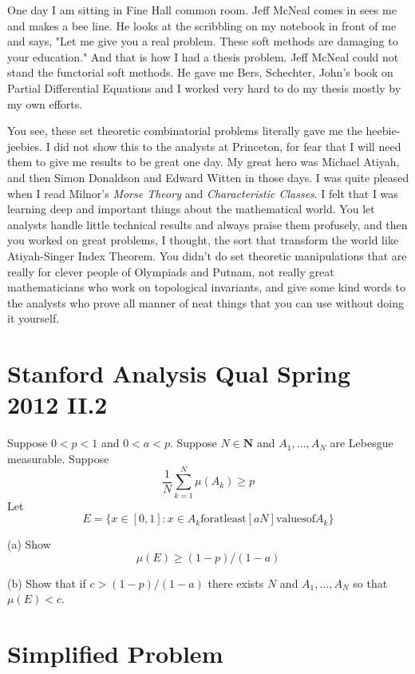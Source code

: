 \documentclass{amsart}
\begin{document}
One day I am sitting in Fine Hall common room.  Jeff McNeal comes in sees me and makes a bee line.  He looks at the scribbling on my notebook in front of me and says, "Let me give you a real problem.  These soft methods are damaging to your education."  And that is how I had a thesis problem.  Jeff McNeal could not stand the functorial soft methods.  He gave me Bers, Schechter, John's book on Partial Differential Equations and I worked very hard to do my thesis mostly by my own efforts.  

You see, these set theoretic combinatorial problems literally gave me the heebie-jeebies.  I did not show this to the analysts at Princeton, for fear that I will need them to give me results to be great one day.  My great hero was Michael Atiyah, and then Simon Donaldson and Edward Witten in those days.  I was quite pleased when I read Milnor's {\em Morse Theory} and {\em Characteristic Classes}.  I felt that I was learning deep and important things about the mathematical world.  You let analysts handle little technical results and always praise them profusely, and then you worked on great problems, I thought, the sort that transform the world like Atiyah-Singer Index Theorem.  You didn't do set theoretic manipulations that are really for clever people of Olympiads and Putnam,  not really great mathematicians who work on topological invariants, and give some kind words to the analysts who prove all manner of neat things that you can use without doing it yourself.





\section{Stanford Analysis Qual Spring 2012 II.2}

Suppose $0<p<1$ and $0<a<p$.  Suppose $N\in \mathbf{N}$ and $A_1,\dots, A_N$ are Lebesgue measurable.  Suppose
\[
\frac{1}{N} \sum_{k=1}^N \mu(A_k) \ge p
\]
Let
\[
E = \{ x \in [0,1]: x \in A_k \mathrm{  for at least } [aN] \mathrm{ values of }A_k \}
\]

(a) Show
\[
\mu(E) \ge (1-p)/(1-a)
\]

(b) Show that if $c > (1-p)/(1-a)$ there exists $N$ and $A_1, \dots, A_N$ so that $\mu(E) < c$.

\section{Simplified Problem}
\end{document}

